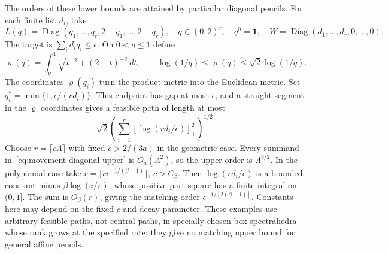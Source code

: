 The orders of these lower bounds are attained by particular diagonal
pencils. For each finite list $d_i$, take
\[
 L(q)=\operatorname{Diag}(q_1,\ldots,q_r,2-q_1,\ldots,2-q_r),
 \quad q\in(0,2)^r,\quad q^0=\mathbf1,
 \quad W=\operatorname{Diag}(d_1,\ldots,d_r,0,\ldots,0).
\]
The target is $\sum_i d_iq_i\leq\epsilon$. On $0<q\leq1$ define
\[
 \varrho(q)=\int_q^1\sqrt{t^{-2}+(2-t)^{-2}}\,dt,
 \qquad
 \log(1/q)\leq\varrho(q)\leq\sqrt2\log(1/q).
\]
The coordinates $\varrho(q_i)$ turn the product metric into the Euclidean
metric. Set $q_i^*=\min\{1,\epsilon/(rd_i)\}$. This endpoint has
gap at most $\epsilon$, and a straight segment in the $\varrho$
coordinates gives a feasible path of length at most
\begin{equation}\label{eq:movement-diagonal-upper}
 \sqrt2\left(\sum_{i=1}^r[\log(rd_i/\epsilon)]_+^2\right)^{1/2}.
\end{equation}
Choose $r=\lceil c\Lambda\rceil$ with fixed $c>2/(3a)$ in the
geometric case. Every summand in~\eqref{eq:movement-diagonal-upper}
is $O_a(\Lambda^2)$, so the upper order is $\Lambda^{3/2}$.
In the polynomial case take
$r=\lceil c\epsilon^{-1/(\beta-1)}\rceil$, $c>C_\beta$.
Then $\log(rd_i/\epsilon)$ is a bounded constant minus
$\beta\log(i/r)$, whose positive-part square has a finite integral
on $(0,1]$. The sum is $O_\beta(r)$, giving the matching order
$\epsilon^{-1/[2(\beta-1)]}$. Constants here may depend on the
fixed $c$ and decay parameter. These examples use arbitrary
feasible paths, not central paths, in specially chosen box spectrahedra
whose rank grows at the specified rate; they give no matching upper
bound for general affine pencils.
